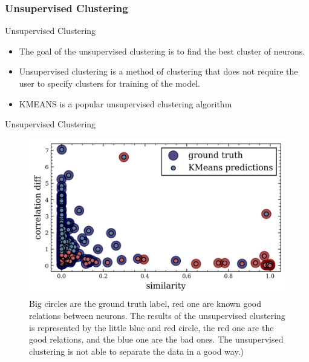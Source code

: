 \documentclass[numbering=fraction]{beamer}
\begin{document}
\subsubsection{Unsupervised Clustering}
\begin{frame}{Unsupervised Clustering}
    \begin{itemize}
        \item The goal of the unsupervised clustering is to find the best cluster of neurons.
        \item Unsupervised clustering is a method of clustering that does not require the user to specify clusters for training of the model.
        \item KMEANS is a popular unsupervised clustering algorithm
    \end{itemize}
\end{frame}
\begin{frame}{Unsupervised Clustering}
    \begin{figure}[H]
        \centering
        \includegraphics[width=.7\linewidth]{./figure/param_space_km.png}
        \caption{\scriptsize{Big circles are the ground truth label, red one are known good relations between neurons. The results of the unsupervised clustering is
                represented by the little blue and red circle, the red one are the good relations, and the blue one are the bad ones. The unsupervised clustering is not able to separate the data in a good way.)}}
    \end{figure}
\end{frame}
\end{document}
